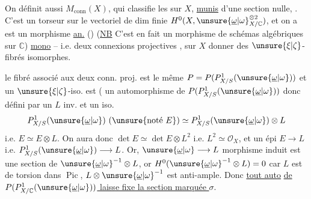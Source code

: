 On définit aussi $M_{\mathrm{conn}}(X)$, qui classifie les  sur $X$, \uline{munis} d'une section nulle, .  C'est un torseur sur le vectoriel de dim finie $H^0(X,\unsure{\underline{\omega}|\omega}^{\otimes2}_{X/\mathbb C})$, et on a
 est un morphisme \uline{an.} ()
(\uline{NB} C'est en fait un morphisme de schémas algébriques sur $\mathbb C$)
 \uline{mono} -- i.e. deux connexions projectives , sur $X$   donner des $\unsure{\xi|\zeta}$-fibrés isomorphes.

 le fibré  associé aux deux conn. proj. est le même $P=P(P^1_{X/S}(\unsure{\underline{\omega}|\omega}))$ et un $\unsure{\xi|\zeta}$-iso. est ( un automorphisme de $P(P^1_{X/S}(\unsure{\underline{\omega}|\omega}))$ donc défini par un $L$ inv. et un iso.
\[
P^1_{X/S}(\unsure{\underline{\omega}|\omega})\ (\unsure{\text{noté }E})\simeq P^1_{X/S}(\unsure{\underline{\omega}|\omega})\otimes L
\]
i.e. $E\simeq E\otimes L$. On aura donc $\det E\simeq\det E\otimes L^2$ i.e. $L^2\simeq\mathcal O_X$, et un épi $E\longrightarrow L$ i.e. $P^1_{X/S}(\unsure{\underline{\omega}|\omega})\longrightarrow L$. Or,   $\unsure{\underline{\omega}|\omega}\longrightarrow L$  morphisme induit est une section de $\unsure{\underline{\omega}|\omega}^{-1}\otimes L$, or $H^0(\unsure{\underline{\omega}|\omega}^{-1}\otimes L)=0$ car
$L$ est de torsion dans $\operatorname{Pic}$, $L\otimes\unsure{\underline{\omega}|\omega}^{-1}$ est anti-ample. Donc \uline{tout auto}  \uline{de $P(P^1_{X/\mathbb C}(\unsure{\underline{\omega}|\omega}))$ laisse fixe la section marquée $\sigma$}.


